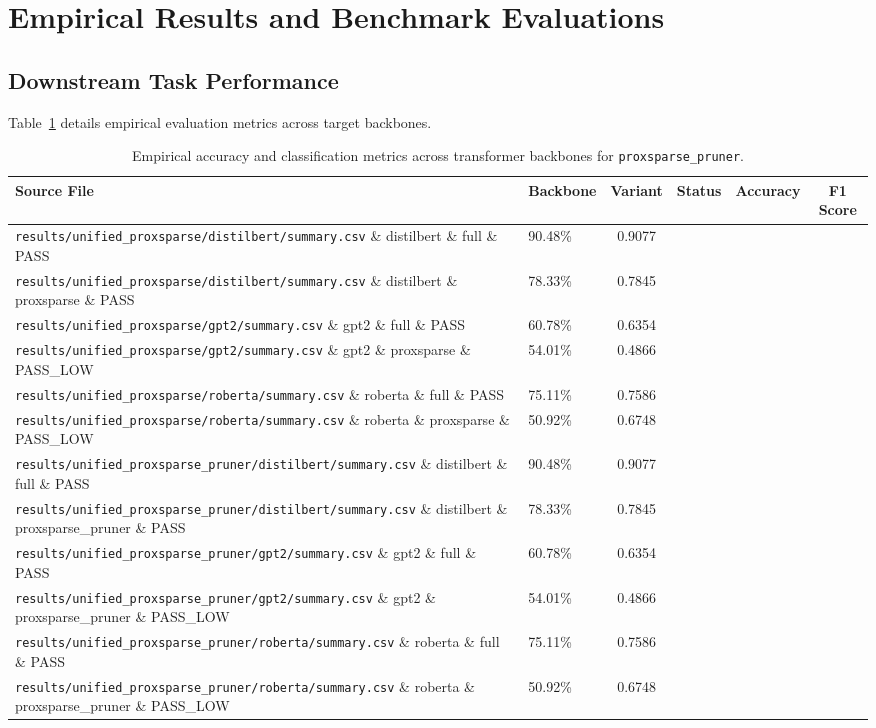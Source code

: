 \section{Empirical Results and Benchmark Evaluations}

\subsection{Downstream Task Performance}
Table~\ref{tab:results_acc_proxsparse\_pruner} details empirical evaluation metrics across target backbones.

\begin{table}[t]
\centering
\small
\begin{tabularx}{\linewidth}{llcccc}
\toprule
\textbf{Source File} & \textbf{Backbone} & \textbf{Variant} & \textbf{Status} & \textbf{Accuracy} & \textbf{F1 Score} \\
\midrule
\texttt{results/unified\_proxsparse/distilbert/summary.csv} \& distilbert \& full \& PASS & 90.48\% & 0.9077 \\
\texttt{results/unified\_proxsparse/distilbert/summary.csv} \& distilbert \& proxsparse \& PASS & 78.33\% & 0.7845 \\
\texttt{results/unified\_proxsparse/gpt2/summary.csv} \& gpt2 \& full \& PASS & 60.78\% & 0.6354 \\
\texttt{results/unified\_proxsparse/gpt2/summary.csv} \& gpt2 \& proxsparse \& PASS\_LOW & 54.01\% & 0.4866 \\
\texttt{results/unified\_proxsparse/roberta/summary.csv} \& roberta \& full \& PASS & 75.11\% & 0.7586 \\
\texttt{results/unified\_proxsparse/roberta/summary.csv} \& roberta \& proxsparse \& PASS\_LOW & 50.92\% & 0.6748 \\
\texttt{results/unified\_proxsparse\_pruner/distilbert/summary.csv} \& distilbert \& full \& PASS & 90.48\% & 0.9077 \\
\texttt{results/unified\_proxsparse\_pruner/distilbert/summary.csv} \& distilbert \& proxsparse\_pruner \& PASS & 78.33\% & 0.7845 \\
\texttt{results/unified\_proxsparse\_pruner/gpt2/summary.csv} \& gpt2 \& full \& PASS & 60.78\% & 0.6354 \\
\texttt{results/unified\_proxsparse\_pruner/gpt2/summary.csv} \& gpt2 \& proxsparse\_pruner \& PASS\_LOW & 54.01\% & 0.4866 \\
\texttt{results/unified\_proxsparse\_pruner/roberta/summary.csv} \& roberta \& full \& PASS & 75.11\% & 0.7586 \\
\texttt{results/unified\_proxsparse\_pruner/roberta/summary.csv} \& roberta \& proxsparse\_pruner \& PASS\_LOW & 50.92\% & 0.6748 \\
\bottomrule
\end{tabularx}
\caption{Empirical accuracy and classification metrics across transformer backbones for \texttt{proxsparse\_pruner}.}
\label{tab:results_acc_proxsparse\_pruner}
\end{table}

